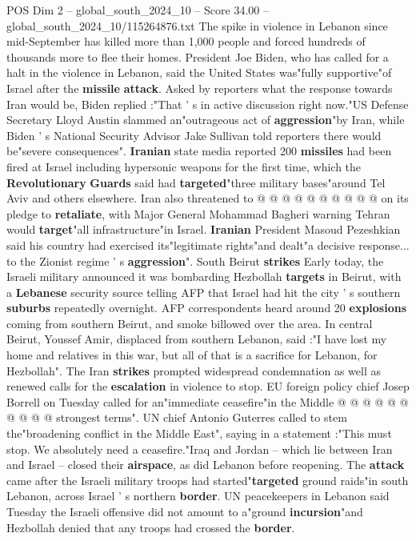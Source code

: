 \begin{textsample}{POS Dim 2 – global\_south\_2024\_10 – Score 34.00 – global\_south\_2024\_10/115264876.txt}
The spike in violence in Lebanon since mid-September has killed more than 1,000 people and forced hundreds of thousands more to flee their homes.
President Joe Biden, who has called for a halt in the violence in Lebanon, said the United States was"fully supportive"of Israel after the \textbf{missile} \textbf{attack}.
Asked by reporters what the response towards Iran would be, Biden replied :"That ' s in active discussion right now."US Defense Secretary Lloyd Austin slammed an"outrageous act of \textbf{aggression}"by Iran, while Biden ' s National Security Advisor Jake Sullivan told reporters there would be"severe consequences". \textbf{Iranian} state media reported 200 \textbf{missiles} had been fired at Israel including hypersonic weapons for the first time, which the \textbf{Revolutionary} \textbf{Guards} said had \textbf{targeted}"three military bases"around Tel Aviv and others elsewhere.
Iran also threatened to @ @ @ @ @ @ @ @ @ @ on its pledge to \textbf{retaliate}, with Major General Mohammad Bagheri warning Tehran would \textbf{target}"all infrastructure"in Israel. \textbf{Iranian} President Masoud Pezeshkian said his country had exercised its"legitimate rights"and dealt"a decisive response... to the Zionist regime ' s \textbf{aggression}".
South Beirut \textbf{strikes} Early today, the Israeli military announced it was bombarding Hezbollah \textbf{targets} in Beirut, with a \textbf{Lebanese} security source telling AFP that Israel had hit the city ' s southern \textbf{suburbs} repeatedly overnight.
AFP correspondents heard around 20 \textbf{explosions} coming from southern Beirut, and smoke billowed over the area.
In central Beirut, Youssef Amir, displaced from southern Lebanon, said :"I have lost my home and relatives in this war, but all of that is a sacrifice for Lebanon, for Hezbollah".
The Iran \textbf{strikes} prompted widespread condemnation as well as renewed calls for the \textbf{escalation} in violence to stop.
EU foreign policy chief Josep Borrell on Tuesday called for an"immediate ceasefire"in the Middle @ @ @ @ @ @ @ @ @ @ strongest terms".
UN chief Antonio Guterres called to stem the"broadening conflict in the Middle East", saying in a statement :"This must stop.
We absolutely need a ceasefire."Iraq and Jordan -- which lie between Iran and Israel -- closed their \textbf{airspace}, as did Lebanon before reopening.
The \textbf{attack} came after the Israeli military troops had started"\textbf{targeted} ground raids"in south Lebanon, across Israel ' s northern \textbf{border}.
UN peacekeepers in Lebanon said Tuesday the Israeli offensive did not amount to a"ground \textbf{incursion}"and Hezbollah denied that any troops had crossed the \textbf{border}.

\end{textsample}
